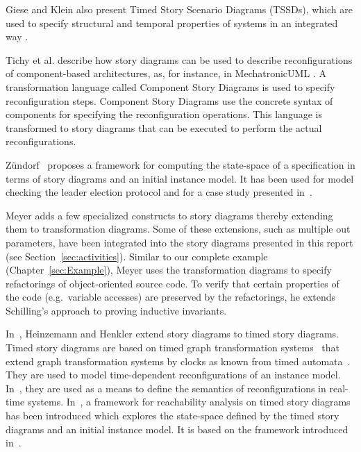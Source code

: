 Giese and Klein also present Timed Story Scenario Diagrams (TSSDs), which are used to specify structural and temporal properties of systems in an integrated way \cite{KG07a}.

Tichy et al. \cite{THH+08} describe how story diagrams can be used to describe reconfigurations of component-based architectures, as, for instance, in MechatronicUML \cite{BBD+12}.
A transformation language called Component Story Diagrams is used to specify reconfiguration steps.
Component Story Diagrams use the concrete syntax of components for specifying the reconfiguration operations.
This language is transformed to story diagrams that can be executed to perform the actual reconfigurations.

Z{\"u}ndorf~\cite{Zue09} proposes a framework for computing the state-space of a specification in terms of story diagrams and an initial instance model. 
It has been used for model checking the leader election protocol and for a case study presented in~\cite{HSJZ10}.

Meyer \cite{Mey09} adds a few specialized constructs to story diagrams thereby extending them to transformation diagrams. Some of these extensions, such as multiple out parameters, have been integrated into the story diagrams presented in this report (see Section~\ref{sec:activities}). Similar to our complete example (Chapter~\ref{sec:Example}), Meyer uses the transformation diagrams to specify refactorings of object-oriented source code. To verify that certain properties of the code (e.g.\ variable accesses) are preserved by the refactorings, he extends Schilling's approach \cite{Sch06} to proving inductive invariants.

In~\cite{HH11b}, Heinzemann and Henkler extend story diagrams to timed story diagrams. 
Timed story diagrams are based on timed graph transformation systems~\cite{EHH+11} that extend graph transformation systems by clocks as known from timed automata~\cite{AD94}. 
They are used to model time-dependent reconfigurations of an instance model. 
In~\cite{EHH+11}, they are used as a means to define the semantics of reconfigurations in real-time systems. 
In~\cite{HSE10}, a framework for reachability analysis on timed story diagrams has been introduced which explores the state-space defined by the timed story diagrams and an initial instance model. 
It is based on the framework introduced in~\cite{Zue09}.


